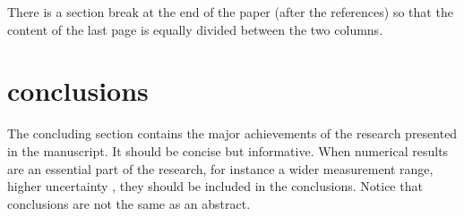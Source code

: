 \documentclass[10pt]{style_src/imeko_acta}
\begin{document}
There is a section break at the end of the paper (after the references) so that the content of the last page is equally divided between the two columns.


\section{conclusions}
The concluding section contains the major achievements of the research presented in the manuscript. It should be concise but informative\cite{cruz2008}. When numerical results are an essential part of the research, for instance a wider measurement range, higher uncertainty \cite{Pop2006}, they should be included in the conclusions.
Notice that conclusions are not the same as an abstract. 

\end{document}
